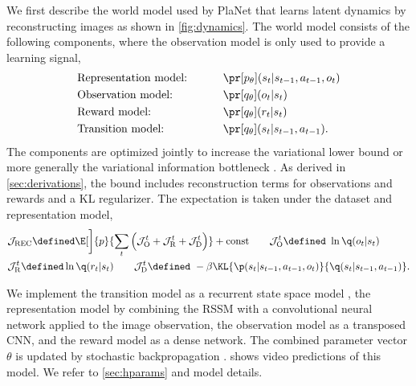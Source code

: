 We first describe the world model used by PlaNet \citep{hafner2018planet} that learns latent dynamics by reconstructing images as shown in \cref{fig:dynamics}. The world model consists of the following components, where the observation model is only used to provide a learning signal,
\begin{gather}
\begin{aligned}
\makebox[12em][l]{Representation model:} && &\pr[p_\theta](s_t|s_{t-1},a_{t-1},o_t) \\
\makebox[12em][l]{Observation model:} && &\pr[q_\theta](o_t|s_t) \\
\makebox[12em][l]{Reward model:} && &\pr[q_\theta](r_t|s_t) \\
\makebox[12em][l]{Transition model:} && &\pr[q_\theta](s_t|s_{t-1},a_{t-1}).
\label{eq:generative_model}
\end{aligned}
\end{gather}%
The components are optimized jointly to increase the variational lower bound \citep[ELBO;][]{jordan1999viintro} or more generally the variational information bottleneck \citep[VIB;][]{tishby2000ib,alemi2016vib}. As derived in \cref{sec:derivations}, the bound includes reconstruction terms for observations and rewards and a KL regularizer. The expectation is taken under the dataset and representation model,
\begin{equation}
\begin{aligned}
&\mathcal{J}_{\mathrm{REC}}
  \defined\E[\bigg]{p}{\sum_t\Big(\mathcal{J}_{\mathrm{O}}^t+\mathcal{J}_{\mathrm{R}}^t+\mathcal{J}_{\mathrm{D}}^t\Big)}+\text{const} \qquad
\mathcal{J}_{\mathrm{O}}^t
  \defined\ \ln\q(o_t|s_t) \\
&\mathcal{J}_{\mathrm{R}}^t
  \defined\ln\q(r_t|s_t) \qquad
\mathcal{J}_{\mathrm{D}}^t
  \defined\ -\beta\KL{\p(s_t|s_{t-1},a_{t-1},o_t)}{\q(s_t|s_{t-1},a_{t-1})}.
\label{eq:generative_objective}
\end{aligned}
\end{equation}%

We implement the transition model as a recurrent state space model \citep[RSSM;][]{hafner2018planet}, the representation model by combining the RSSM with a convolutional neural network \citep[CNN;][]{lecun1989cnn} applied to the image observation, the observation model as a transposed CNN, and the reward model as a dense network. The combined parameter vector $\theta$ is updated by stochastic backpropagation \citep{kingma2013vae,rezende2014vae}.  shows video predictions of this model. We refer to \cref{sec:hparams} and \citet{hafner2018planet} model details.

